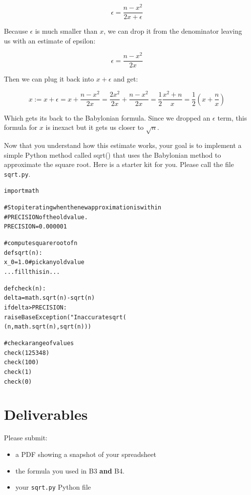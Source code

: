 \begin{fullwidth}
\[
\epsilon = \frac{n - x^2}{2x + \epsilon}
\]

Because $\epsilon$ is much smaller than $x$, we can drop it from the denominator leaving us with an estimate of epsilon:

\[
\epsilon = \frac{n - x^2}{2x}
\]

Then we can plug it back into $x + \epsilon$ and get:

\[
x := x + \epsilon = x + \frac{n - x^2}{2x} = \frac{2x^2}{2x} + \frac{n - x^2}{2x} = \frac{1}{2}\frac{x^2 + n}{x} = \frac{1}{2}(x + \frac{n}{x})
\]

Which gets its back to the Babylonian formula. Since we dropped an $\epsilon$ term, this formula for $x$ is inexact but it gets us closer to $\sqrt{n}$.


Now that you understand how this estimate works, your goal is to implement a simple Python method called sqrt() that uses the Babylonian method to approximate the square root. Here is a starter kit for you. Please call the file {\tt sqrt.py}.

\begin{alltt}\small
import math

# Stop iterating when the new approximation is within
# PRECISION of the old value.
PRECISION = 0.000001

# compute square root of n
def sqrt(n):
    x_0 = 1.0 # pick any old value
    ... fill this in ...

def check(n):
    delta = math.sqrt(n) - sqrt(n)
    if delta > PRECISION:
        raise BaseException("Inaccurate sqrt(%
            (n, math.sqrt(n), sqrt(n)))

# check a range of values
check(125348)
check(100)
check(1)
check(0)
\end{alltt}

\section{Deliverables}

Please submit:

\begin{itemize}
\item a PDF showing a snapshot of your spreadsheet
\item the formula you used in B3 {\bf and} B4.
\item your {\tt sqrt.py} Python file
\end{itemize}

\end{fullwidth}
